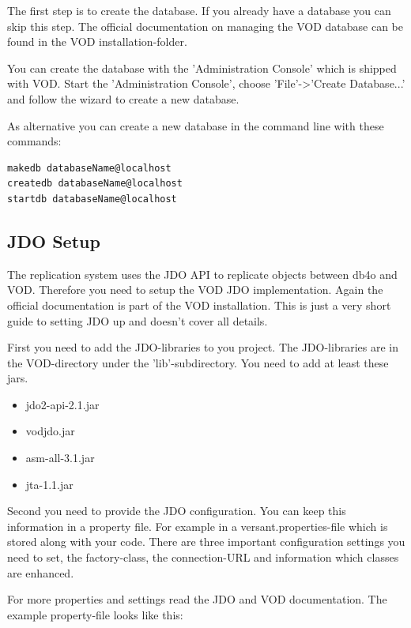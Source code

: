 The first step is to create the database. If you already have a database you can skip this step. The official documentation on managing the VOD database can be found in the VOD installation-folder.

You can create the database with the 'Administration Console' which is shipped with VOD. Start the 'Administration Console', choose 'File'-\textgreater{}'Create Database...' and follow the wizard to create a new database.

As alternative you can create a new database in the command line with these commands:

\begin{lstlisting}
makedb databaseName@localhost
createdb databaseName@localhost
startdb databaseName@localhost
\end{lstlisting}

\subsection{JDO Setup}
\label{drs:db4o-replication-system-drs-vod-setup:jdosetup}

The replication system uses the JDO API to replicate objects between db4o and VOD. Therefore you need to setup the VOD JDO implementation. Again the official documentation is part of the VOD installation. This is just a very short guide to setting JDO up and doesn't cover all details.

First you need to add the JDO-libraries to you project. The JDO-libraries are in the VOD-directory under the 'lib'-subdirectory. You need to add at least these jars.

\begin{itemize}
\item jdo2-api-2.1.jar
\item vodjdo.jar
\item asm-all-3.1.jar
\item jta-1.1.jar
\end{itemize}

Second you need to provide the JDO configuration. You can keep this information in a property file. For example in a versant.properties-file which is stored along with your code. There are three important configuration settings you need to set, the factory-class, the connection-URL and information which classes are enhanced.

For more properties and settings read the JDO and VOD documentation. The example property-file looks like this:

